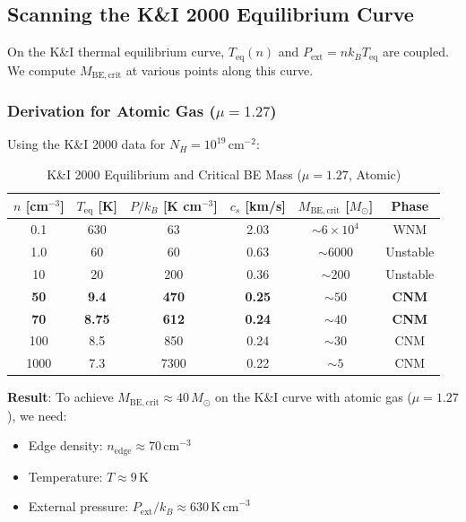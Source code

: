 \documentclass[11pt,a4paper]{article}
\newcommand{\Msun}{M_\odot}
\begin{document}
\subsection{Scanning the K\&I 2000 Equilibrium Curve}

On the K\&I thermal equilibrium curve, $T_\mathrm{eq}(n)$ and $P_\mathrm{ext} = n k_B T_\mathrm{eq}$
are coupled. We compute $M_\mathrm{BE,crit}$ at various points along this curve.

\subsubsection{Derivation for Atomic Gas ($\mu = 1.27$)}

Using the K\&I 2000 data for $N_H = 10^{19}\,\mathrm{cm}^{-2}$:

\begin{table}[h]
\centering
\caption{K\&I 2000 Equilibrium and Critical BE Mass ($\mu = 1.27$, Atomic)}
\label{tab:ki2000_be_mass}
\begin{tabular}{cccccc}
\toprule
\textbf{$n$ [cm$^{-3}$]} & \textbf{$T_\mathrm{eq}$ [K]} & \textbf{$P/k_B$ [K cm$^{-3}$]} & \textbf{$c_s$ [km/s]} & \textbf{$M_\mathrm{BE,crit}$ [$\Msun$]} & \textbf{Phase} \\
\midrule
0.1 & 630 & 63 & 2.03 & $\sim 6 \times 10^4$ & WNM \\
1.0 & 60 & 60 & 0.63 & $\sim 6000$ & Unstable \\
10 & 20 & 200 & 0.36 & $\sim 200$ & Unstable \\
\textbf{50} & \textbf{9.4} & \textbf{470} & \textbf{0.25} & \textbf{$\sim 50$} & \textbf{CNM} \\
\textbf{70} & \textbf{8.75} & \textbf{612} & \textbf{0.24} & \textbf{$\sim 40$} & \textbf{CNM} \\
100 & 8.5 & 850 & 0.24 & $\sim 30$ & CNM \\
1000 & 7.3 & 7300 & 0.22 & $\sim 5$ & CNM \\
\bottomrule
\end{tabular}
\end{table}

\textbf{Result}: To achieve $M_\mathrm{BE,crit} \approx 40\,\Msun$ on the K\&I curve with
atomic gas ($\mu = 1.27$), we need:
\begin{itemize}
    \item Edge density: $n_\mathrm{edge} \approx 70\,\mathrm{cm}^{-3}$
    \item Temperature: $T \approx 9\,\mathrm{K}$
    \item External pressure: $P_\mathrm{ext}/k_B \approx 630\,\mathrm{K\,cm}^{-3}$
\end{itemize}
\end{document}
